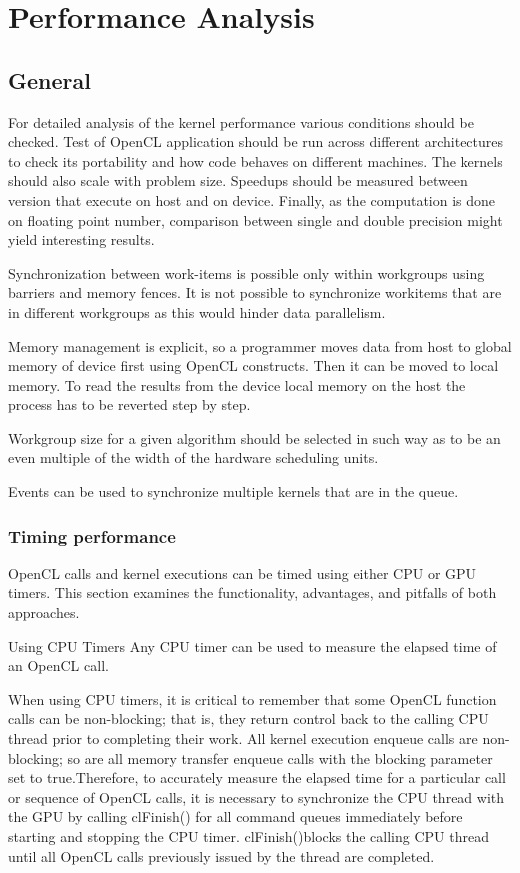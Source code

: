 \chapter{Performance Analysis}
\section{General}
For detailed analysis of the kernel performance various conditions should be checked. Test of OpenCL application should be run across different architectures to check its portability and how code behaves on different machines. The kernels should also scale with problem size. Speedups should be measured between version that execute on host and on device. Finally, as the computation is done on floating point number, comparison between single and double precision might yield interesting results.

Synchronization between work-items is possible only within workgroups using barriers and memory fences. It is not possible to synchronize workitems that are in different workgroups as this would hinder data parallelism.

Memory management is explicit, so a programmer moves data from host to global memory of device first using OpenCL constructs. Then it can be moved to local memory. To read the results from the device local memory on the host the process has to be reverted step by step.

Workgroup size for a given algorithm should be selected in such way as to be an even multiple of the width of the hardware scheduling units.

Events can be used to synchronize multiple kernels that are in the queue.
			

\subsection{Timing performance}
OpenCL calls and kernel executions can be timed using either CPU or GPU timers. This section examines the functionality, advantages, and pitfalls of both approaches.\cite{nvidia2011openclbest}

Using CPU Timers
Any CPU timer can be used to measure the elapsed time of an OpenCL call. \cite{nvidia2011openclbest}

When using CPU timers, it is critical to remember that some OpenCL function calls can be non-blocking; that is, they return control back to the calling CPU thread prior to completing their work. All kernel execution enqueue calls are non-blocking; so are all memory transfer enqueue calls with the blocking parameter set to true.Therefore, to accurately measure the elapsed time for a particular call or sequence of OpenCL calls, it is necessary to synchronize the CPU thread with the GPU by calling clFinish() for all command queues immediately before starting and stopping the CPU timer. clFinish()blocks the calling CPU thread until all OpenCL calls previously issued by the thread are completed.\cite{nvidia2011openclbest}

